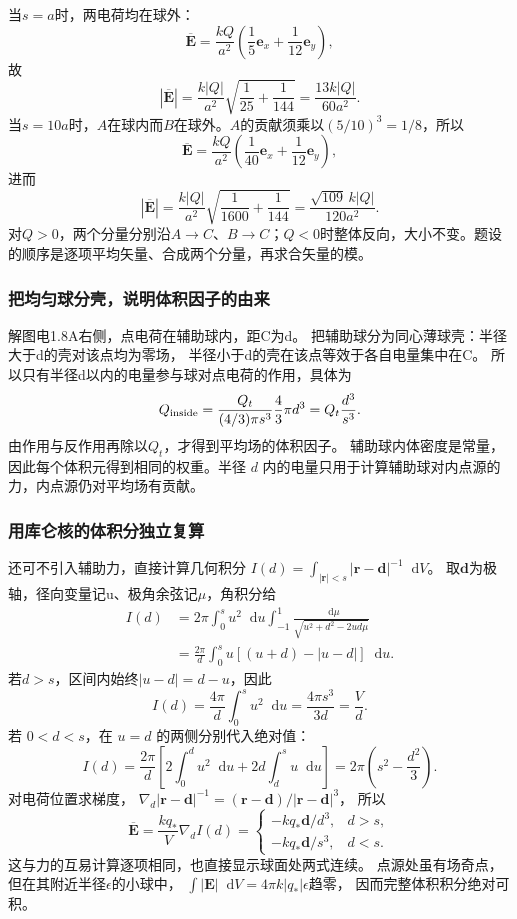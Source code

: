 \documentclass[UTF8,fontset=fandol,a4paper,11pt]{ctexart}
\newcommand{\dd}{\mathop{}\!\mathrm{d}}
\newcommand{\vect}[1]{\bm{#1}}
\newcommand{\result}[1]{\begin{equation*}\boxed{#1}\end{equation*}}
\begin{document}
当$s=a$时，两电荷均在球外：
\[\overline{\vect E}=\frac{kQ}{a^2}\left(\frac15\vect e_x+\frac1{12}\vect e_y\right),\]
故
\result{|\overline{\vect E}|=\frac{k|Q|}{a^2}\sqrt{\frac1{25}+\frac1{144}}
=\frac{13k|Q|}{60a^2}.}
当$s=10a$时，$A$在球内而$B$在球外。$A$的贡献须乘以$(5/10)^3=1/8$，所以
\[\overline{\vect E}=\frac{kQ}{a^2}\left(\frac1{40}\vect e_x+\frac1{12}\vect e_y\right),\]
进而
\result{|\overline{\vect E}|=\frac{k|Q|}{a^2}\sqrt{\frac1{1600}+\frac1{144}}
=\frac{\sqrt{109}\,k|Q|}{120a^2}.}
对$Q>0$，两个分量分别沿$A\to C$、$B\to C$；$Q<0$时整体反向，大小不变。题设的顺序是逐项平均矢量、合成两个分量，再求合矢量的模。
\subsubsection*{把均匀球分壳，说明体积因子的由来}
解图电1.8A右侧，点电荷在辅助球内，距C为d。
把辅助球分为同心薄球壳：半径大于d的壳对该点均为零场，
半径小于d的壳在该点等效于各自电量集中在C。
所以只有半径d以内的电量参与球对点电荷的作用，具体为
\[
Q_{\rm inside}=\frac{Q_t}{(4/3)\pi s^3}\frac43\pi d^3
=Q_t\frac{d^3}{s^3}.
\]
由作用与反作用再除以$Q_t$，才得到平均场的体积因子。
辅助球内体密度是常量，因此每个体积元得到相同的权重。半径 $d$ 内的电量只用于计算辅助球对内点源的力，内点源仍对平均场有贡献。

\subsubsection*{用库仑核的体积分独立复算}
还可不引入辅助力，直接计算几何积分
$I(d)=\int_{|\vect r|<s}|\vect r-\vect d|^{-1}\dd V$。
取$\vect d$为极轴，径向变量记u、极角余弦记$\mu$，角积分给
\[
\begin{aligned}
I(d)&=2\pi\int_0^s u^2\dd u\int_{-1}^1
\frac{\dd\mu}{\sqrt{u^2+d^2-2ud\mu}}\\
&=\frac{2\pi}d\int_0^s u[(u+d)-|u-d|]\dd u.
\end{aligned}
\]
若$d>s$，区间内始终$|u-d|=d-u$，因此
\[
I(d)=\frac{4\pi}d\int_0^s u^2\dd u
=\frac{4\pi s^3}{3d}=\frac Vd.
\]
若 $0<d<s$，在 $u=d$ 的两侧分别代入绝对值：
\[
I(d)=\frac{2\pi}d\left[2\int_0^d u^2\dd u
+2d\int_d^s u\dd u\right]
=2\pi\left(s^2-\frac{d^2}3\right).
\]
对电荷位置求梯度，
$\nabla_d|\vect r-\vect d|^{-1}=(\vect r-\vect d)/|\vect r-\vect d|^3$，
所以
\[
\overline{\vect E}=\frac{kq_*}V\nabla_d I(d)
=\begin{cases}-kq_*\vect d/d^3,&d>s,\\-kq_*\vect d/s^3,&d<s.\end{cases}
\]
这与力的互易计算逐项相同，也直接显示球面处两式连续。
点源处虽有场奇点，但在其附近半径$\epsilon$的小球中，
$\int|\vect E|\dd V=4\pi k|q_*|\epsilon$趋零，
因而完整体积积分绝对可积。
\end{document}
